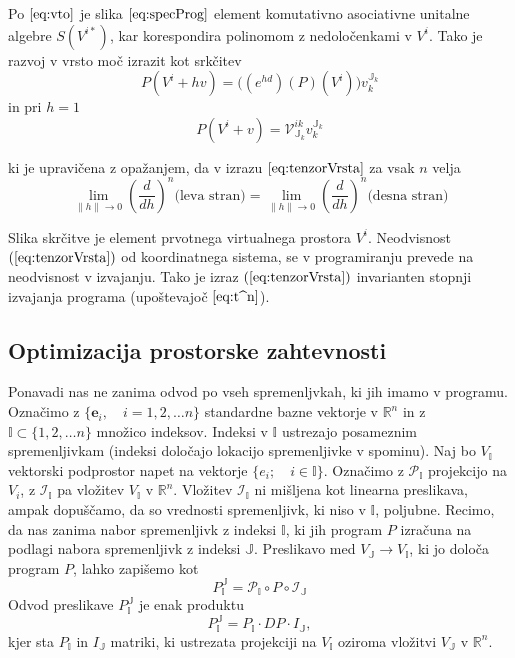 \documentclass{article}
\newcommand{\RR}{\mathbb{R}}
\newcommand{\II}{\mathbb{I}}
\newcommand{\JJ}{\mathbb{J}}
\newcommand{\VV}{\mathcal{V}}
\newcommand{\e}{\mathbf{e}}
\begin{document}
 Po $\eqref{eq:vto}$ je slika $\eqref{eq:specProg}$ element komutativno asociativne unitalne algebre $S(V^{i*})$, kar korespondira polinomom z nedoločenkami v $V^i$. Tako je razvoj v vrsto moč izrazit kot srkčitev
 \begin{equation}\label{eq:tenzorVrsta}
 	P(V^i+hv) = \Big((e^{hd})(P)(V^i)\Big)v^{\JJ_k}_{k}
 \end{equation}
 in pri $h=1$
 $$P(V^i+v) = \VV^{ik}_{\JJ_k}v^{\JJ_k}_{k}$$
 
ki je upravičena z opažanjem, da v izrazu $\eqref{eq:tenzorVrsta}$ za vsak $n$ velja
$$\lim\limits_{\lVert h\rVert\to 0}(\frac{d}{dh})^n\text{(leva stran)}=\lim\limits_{\lVert h\rVert\to 0}(\frac{d}{dh})^n\text{(desna stran)}$$

Slika skrčitve je element prvotnega virtualnega prostora $V^i$. Neodvisnost $(\ref{eq:tenzorVrsta})$ od koordinatnega sistema, se v programiranju prevede na neodvisnost v izvajanju. Tako je izraz $(\ref{eq:tenzorVrsta})$ invarianten stopnji izvajanja programa (upoštevajoč $\eqref{eq:t^n}$). 

\subsection{Optimizacija prostorske zahtevnosti}
Ponavadi nas ne zanima odvod po vseh spremenljvkah, ki jih imamo v programu.
Označimo z $\{\e_i,\quad i=1,2,\ldots n\}$ standardne bazne vektorje v $\RR^n$ in z
$\II\subset\{1,2,\ldots n\}$ množico indeksov. Indeksi v $\II$ ustrezajo
posameznim spremenljivkam (indeksi določajo lokacijo spremenljivke v spominu). Naj bo $V_\II$ vektorski
podprostor napet na vektorje $\{e_i;\quad i\in\II\}$. Označimo z 
$\mathcal{P}_\II$ projekcijo na $V_i$, z $\mathcal{I}_\II$ pa vložitev $V_\II$ v
$\RR^n$. Vložitev $\mathcal{I}_\II$ ni mišljena kot linearna preslikava, ampak
dopuščamo, da so vrednosti spremenljivk, ki niso v $\II$, poljubne. Recimo, da nas zanima nabor spremenljivk z indeksi $\II$, ki jih
program $P$ izračuna na podlagi nabora spremenljivk z indeksi $\mathbb{J}$.
Preslikavo med $V_\JJ\to V_\II$, ki jo določa program $P$, lahko zapišemo kot
\begin{equation}
  \label{eq:zozitev}
  P^{\JJ}_{\II}=\mathcal{P}_\II\circ P\circ \mathcal{I}_\JJ 
\end{equation}
Odvod preslikave $ P^{\JJ}_{\II}$ je enak produktu
\begin{equation*}
  P^{\JJ}_{\II}=P_\II\cdot DP\cdot I_\JJ,   
\end{equation*}
kjer sta $P_\II$ in  $I_\JJ$ matriki, ki ustrezata projekciji na $V_\II$ oziroma
vložitvi $V_\JJ$ v $\RR^n$.
\end{document}
